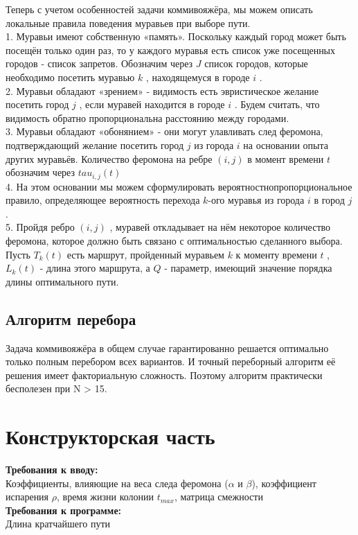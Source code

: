 \documentclass[12pt]{report}
\begin{document}
Теперь с учетом особенностей задачи коммивояжёра, мы можем описать локальные правила поведения муравьев при выборе пути.\\ 
	1. Муравьи имеют собственную «память». Поскольку каждый город может быть посещён только один раз, то у каждого муравья есть список уже посещенных городов - список запретов. Обозначим через $J$ список городов, которые необходимо посетить муравью $k$ , находящемуся в городе $i$ . \\
	2. Муравьи обладают «зрением» - видимость есть эвристическое желание посетить город $j$ , если муравей находится в городе $i$ . Будем считать, что видимость обратно пропорциональна расстоянию между городами. \\
	3. Муравьи обладают «обонянием» - они могут улавливать след феромона, подтверждающий желание посетить город $j$ из города $i$ на основании опыта других муравьёв. Количество феромона на ребре $(i,j)$ в момент времени $t$ обозначим через  $tau _{i,j} (t)$ \\
	 4. На этом основании мы можем сформулировать вероятностнопропорциональное правило, определяющее вероятность перехода $k$-ого муравья из города $i$  в город $j$. \\
	5. Пройдя ребро $(i,j)$ , муравей откладывает на нём некоторое количество феромона, которое должно быть связано с оптимальностью сделанного выбора. Пусть $T _{k} (t)$ есть маршрут, пройденный муравьем $k$ к моменту времени $t$ , $L _{k} (t)$ - длина этого маршрута, а $Q$ - параметр, имеющий значение порядка длины оптимального пути. \\


\section{Алгоритм перебора}
\hspace{6mm} Задача коммивояжёра в общем случае гарантированно решается оптимально только полным перебором всех вариантов. И точный переборный алгоритм её решения имеет факториальную сложность. Поэтому алгоритм практически бесполезен при N > 15.

\chapter{Конструкторская часть}
\textbf{Требования к вводу:}\\
Коэффициенты, влияющие на веса следа феромона ($\alpha$ и $\beta$), коэффициент испарения $\rho$, время жизни колонии $t_{max}$, матрица смежности\\
\textbf{Требования к программе:}\\
Длина кратчайшего пути
\end{document}
